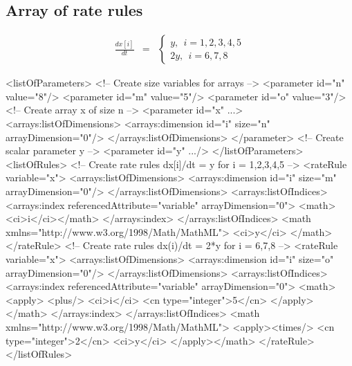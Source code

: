

\subsection{Array of rate rules}

\begin{eqnarray*}
\frac{dx[i]}{dt} & = & \left\{ \begin{array}{l}
  y,~~i = 1,2,3,4,5 \\
 2y,~~i = 6, 7, 8 
\end{array}
\right.
\end{eqnarray*}
\begin{example}
<listOfParameters>
 <!-- Create size variables for arrays -->
 <parameter id="n" value="8"/>
 <parameter id="m" value="5"/>
 <parameter id="o" value="3"/>
 <!-- Create array x of size n -->
 <parameter id="x" ...> 
  <arrays:listOfDimensions>
   <arrays:dimension id="i" size="n" arrayDimension="0"/>
  </arrays:listOfDimensions>
 </parameter>
 <!-- Create scalar parameter y -->
 <parameter id="y" .../>
</listOfParameters>
<listOfRules>
 <!-- Create rate rules dx[i]/dt = y for i = 1,2,3,4,5 -->
 <rateRule variable="x">
  <arrays:listOfDimensions>
   <arrays:dimension id="i" size="m" arrayDimension="0"/>
  </arrays:listOfDimensions>
  <arrays:listOfIndices>
   <arrays:index referencedAttribute="variable" arrayDimension="0">
    <math><ci>i</ci></math>
   </arrays:index>
  </arrays:listOfIndices>
  <math xmlns="http://www.w3.org/1998/Math/MathML">
   <ci>y</ci>
  </math>
 </rateRule>
 <!-- Create rate rules dx(i)/dt = 2*y for i = 6,7,8 -->
 <rateRule variable="x">
  <arrays:listOfDimensions>
   <arrays:dimension id="i" size="o" arrayDimension="0"/>
  </arrays:listOfDimensions>
  <arrays:listOfIndices>
   <arrays:index referencedAttribute="variable" arrayDimension="0">
    <math>
    <apply>
      <plus/>
       <ci>i</ci>
       <cn type="integer">5</cn>
     </apply>
    </math>
   </arrays:index>
  </arrays:listOfIndices>
  <math xmlns="http://www.w3.org/1998/Math/MathML">
  <apply><times/>
   <cn type="integer">2</cn> <ci>y</ci>
  </apply></math> 
 </rateRule>
</listOfRules>
\end{example}

